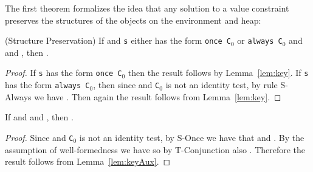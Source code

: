 The
first theorem formalizes the idea that any solution to a value
constraint preserves the structures of the objects on the
environment and heap:

\begin{Theorem} (Structure Preservation)
 If \emph{}
 and {\tt s} either has the form {\tt once C$_0$} or {\tt always
   C$_0$} and \emph{} and
\emph{}, then
  \emph{}. 
\end{Theorem}
\begin{proof}
If {\tt s} has the form {\tt once C$_0$} then the result follows by
Lemma~\ref{lem:key}.  If {\tt s} has the form {\tt always C$_0$}, then
since
 and {\tt C$_0$} is not an identity test, by
rule {\sc S-Always} we have 
.
Then again the result follows from Lemma~\ref{lem:key}.
\end{proof}

\begin{Lemma}
\label{lem:key}
 If \emph{}
and \emph{} and
\emph{}, then
  \emph{}. 
\end{Lemma}
\begin{proof}
Since  and  {\tt C$_0$} is not an
 identity test, by {\sc S-Once} we have that 
 and
    .
By the assumption of well-formedness we have  so
by {\sc T-Conjunction} also . 
Therefore the result follows from Lemma~\ref{lem:keyAux}.
\end{proof}

